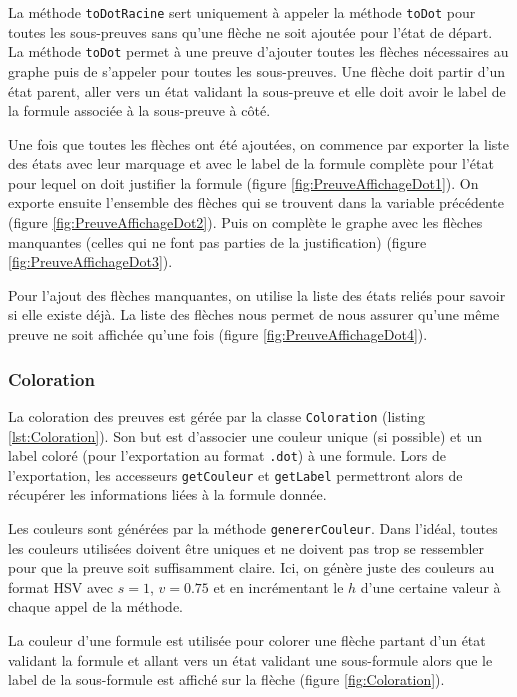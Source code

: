 \documentclass[dvipsnames]{report}
\begin{document}
La méthode \texttt{toDotRacine} sert uniquement à appeler la méthode \texttt{toDot} pour toutes les sous-preuves sans qu'une flèche ne soit ajoutée pour l'état de départ. La méthode \texttt{toDot} permet à une preuve d'ajouter toutes les flèches nécessaires au graphe puis de s'appeler pour toutes les sous-preuves. Une flèche doit partir d'un état parent, aller vers un état validant la sous-preuve et elle doit avoir le label de la formule associée à la sous-preuve à côté.

Une fois que toutes les flèches ont été ajoutées, on commence par exporter la liste des états avec leur marquage et avec le label de la formule complète pour l'état pour lequel on doit justifier la formule (figure \ref{fig:PreuveAffichageDot1}). On exporte ensuite l'ensemble des flèches qui se trouvent dans la variable précédente (figure \ref{fig:PreuveAffichageDot2}). Puis on complète le graphe avec les flèches manquantes (celles qui ne font pas parties de la justification) (figure \ref{fig:PreuveAffichageDot3}).



Pour l'ajout des flèches manquantes, on utilise la liste des états reliés pour savoir si elle existe déjà. La liste des flèches nous permet de nous assurer qu'une même preuve ne soit affichée qu'une fois (figure \ref{fig:PreuveAffichageDot4}).



\subsubsection{Coloration}

La coloration des preuves est gérée par la classe \texttt{Coloration} (listing \ref{lst:Coloration}). Son but est d'associer une couleur unique (si possible) et un label coloré (pour l'exportation au format \texttt{.dot}) à une formule. Lors de l'exportation, les accesseurs \texttt{getCouleur} et \texttt{getLabel} permettront alors de récupérer les informations liées à la formule donnée.

Les couleurs sont générées par la méthode \texttt{genererCouleur}. Dans l'idéal, toutes les couleurs utilisées doivent être uniques et ne doivent pas trop se ressembler pour que la preuve soit suffisamment claire. Ici, on génère juste des couleurs au format HSV avec $s=1$, $v=0.75$ et en incrémentant le $h$ d'une certaine valeur à chaque appel de la méthode.

La couleur d'une formule est utilisée pour colorer une flèche partant d'un état validant la formule et allant vers un état validant une sous-formule alors que le label de la sous-formule est affiché sur la flèche (figure \ref{fig:Coloration}).
\end{document}
